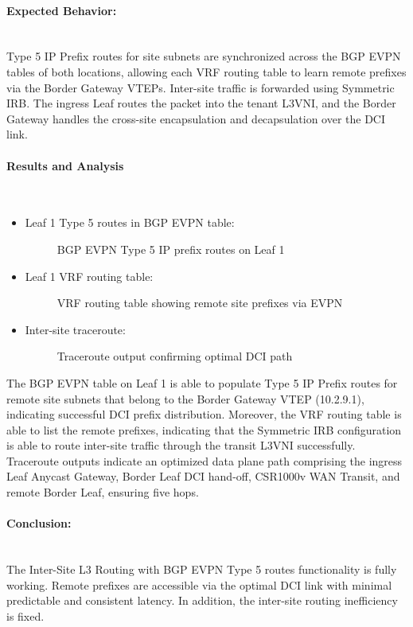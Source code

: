 \paragraph{Expected Behavior:}~\\
Type 5 IP Prefix routes for site subnets are synchronized across the BGP EVPN tables of both locations, allowing each VRF routing table to learn remote prefixes via the Border Gateway VTEPs. Inter-site traffic is forwarded using Symmetric IRB. The ingress Leaf routes the packet into the tenant L3VNI, and the Border Gateway handles the cross-site encapsulation and decapsulation over the DCI link.
\paragraph{Results and Analysis}~\\
\begin{itemize}
    \item []Leaf 1 Type 5 routes in BGP EVPN table:
    \begin{figure}[!htbp]
        \centering
        \Typeroutes
        \caption{BGP EVPN Type 5 IP prefix routes on Leaf 1}
        \label{fig:type5-routes}
    \end{figure}
    \item []Leaf 1 VRF routing table:
    \begin{figure}[!htbp]
        \centering
        \VRFrouting
        \caption{VRF routing table showing remote site prefixes via EVPN}
        \label{fig:vrf-routing}
    \end{figure}
    \item []Inter-site traceroute:
    \begin{figure}[!htbp]
        \centering
        \intersite
        \caption{Traceroute output confirming optimal DCI path}
        \label{fig:intersite-traceroute}
    \end{figure}
\end{itemize}
The BGP EVPN table on Leaf 1 is able to populate Type 5 IP Prefix routes for remote site subnets that belong to the Border Gateway VTEP (10.2.9.1), indicating successful DCI prefix distribution. Moreover, the VRF routing table is able to list the remote prefixes, indicating that the Symmetric IRB configuration is able to route inter-site traffic through the transit L3VNI successfully. Traceroute outputs indicate an optimized data plane path comprising the ingress Leaf Anycast Gateway, Border Leaf DCI hand-off, CSR1000v WAN Transit, and remote Border Leaf, ensuring five hops.
\paragraph{Conclusion:}~\\
The Inter-Site L3 Routing with BGP EVPN Type 5 routes functionality is fully working. Remote prefixes are accessible via the optimal DCI link with minimal predictable and consistent latency. In addition, the inter-site routing inefficiency is fixed.

